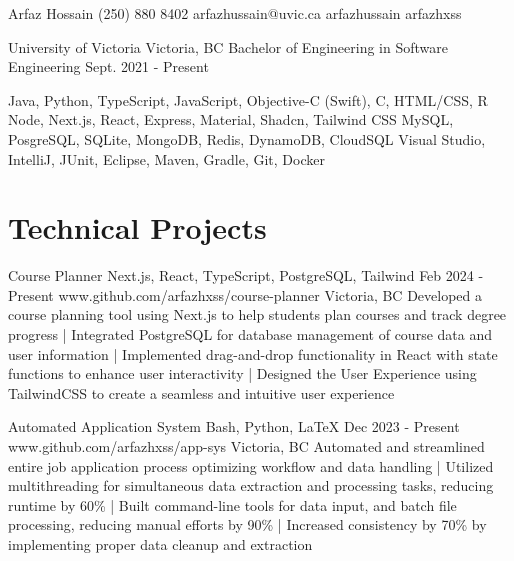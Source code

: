 \documentclass[a4paper,10pt]{article}
\begin{document}
\header
{Arfaz Hossain}				%
{ (250) 880 8402}			%
{arfazhussain@uvic.ca} 			%
{arfazhussain} 				%
{arfazhxss} 				%


\education
{University of Victoria}
{Victoria, BC}
{Bachelor of Engineering in Software Engineering}
{Sept. 2021 - Present}

\technicalskills
{Java, Python, TypeScript, JavaScript, Objective-C (Swift), C\plusplus, HTML/CSS, R}
{Node, Next.js, React, Express, Material, Shadcn, Tailwind CSS}
{MySQL, PosgreSQL, SQLite, MongoDB, Redis, DynamoDB, CloudSQL}
{Visual Studio, IntelliJ, JUnit, Eclipse, Maven, Gradle, Git, Docker}

\section{Technical Projects}
\projectentry
{Course Planner}
{Next.js, React, TypeScript, PostgreSQL, Tailwind}
{Feb 2024 - Present}
{www.github.com/arfazhxss/course-planner}
{Victoria, BC}
{Developed a course planning tool using Next.js to help students plan courses and track degree progress 
| Integrated PostgreSQL for database management of course data and user information 
| Implemented drag-and-drop functionality in React with state functions to enhance user interactivity 
| Designed the User Experience using TailwindCSS to create a seamless and intuitive user experience
}

\projectentry
{Automated Application System}
{Bash, Python, LaTeX}
{Dec 2023 - Present}
{www.github.com/arfazhxss/app-sys}
{Victoria, BC}
{Automated and streamlined entire job application process optimizing workflow and data handling
| Utilized multithreading for simultaneous data extraction and processing tasks, reducing runtime by 60\% 
| Built command-line tools for data input, and batch file processing, reducing manual efforts by 90\% 
| Increased consistency by 70\% by implementing proper data cleanup and extraction}
\end{document}
